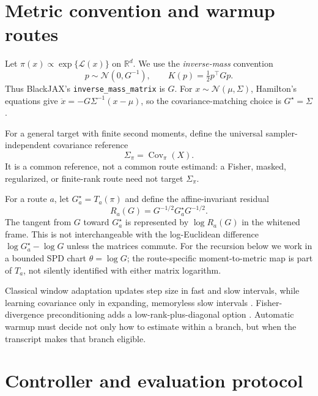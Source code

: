 \documentclass[11pt]{article}
\theoremstyle{plain}
\theoremstyle{definition}
\theoremstyle{remark}
\begin{document}
\section{Metric convention and warmup routes}\label{sec:setup}

Let $\pi(x)\propto\exp\{\mathcal L(x)\}$ on $\mathbb R^d$. We use the
\emph{inverse-mass} convention
\begin{equation}
  p\sim\mathcal N(0,G^{-1}),\qquad
  K(p)=\tfrac12p^\top Gp.                                    \label{eq:metric}
\end{equation}
Thus BlackJAX's \texttt{inverse\_mass\_matrix} is $G$. For
$x\sim\mathcal N(\mu,\Sigma)$, Hamilton's equations give
$\ddot x=-G\Sigma^{-1}(x-\mu)$, so the covariance-matching choice is
$G^\star=\Sigma$.

For a general target with finite second moments, define the universal
sampler-independent covariance reference
\[
  \Sigma_\pi=\operatorname{Cov}_\pi(X).
\]
It is a common reference, not a common route estimand: a Fisher, masked,
regularized, or finite-rank route need not target $\Sigma_\pi$.

For a route $a$, let $G_a^\star=T_a(\pi)$ and define the affine-invariant
residual
\[
  R_a(G)=G^{-1/2}G_a^\star G^{-1/2}.
\]
The tangent from $G$ toward $G_a^\star$ is represented by
$\log R_a(G)$ in the whitened frame. This is not interchangeable with the
log-Euclidean difference $\log G_a^\star-\log G$ unless the matrices commute.
For the recursion below we work in a bounded SPD chart $\theta=\log G$; the
route-specific moment-to-metric map is part of $T_a$, not silently identified
with either matrix logarithm.

Classical window adaptation updates step size in fast and slow intervals, while
learning covariance only in expanding, memoryless slow intervals
\citep{carpenter2017stan,cmdstan239warmup}. Fisher-divergence
preconditioning adds a low-rank-plus-diagonal option
\citep{seyboldt2026preconditioning}. Automatic warmup must decide not only how
to estimate within a branch, but when the transcript makes that branch eligible.

\section{Controller and evaluation protocol}\label{sec:controller}
\end{document}
